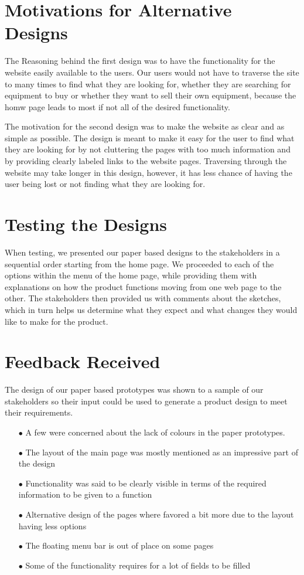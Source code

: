 \documentclass[11pt]{article}
\begin{document}
\newpage

\section{Motivations for Alternative Designs}
	The Reasoning behind the first design was to have the functionality for the website easily available to the users. Our users would not have to traverse the site to many times to find what they are looking for, whether they are searching for equipment to buy or whether they want to sell their own equipment, because the homw page leads to most if not all of the desired functionality.
	
	The motivation for the second design was to make the website as clear and as simple as possible. The design is meant to make it easy for the user to find what they are looking for by not cluttering the pages with too much information and by providing clearly labeled links to the website pages. Traversing through the website may take longer in this design, however, it has less chance of having the user being lost or not finding what they are looking for.

\section{Testing the Designs}
	When testing, we presented our paper based designs to the stakeholders in a sequential order starting from the home page. We proceeded to each of the options within the menu of the home page, while providing them with explanations on how the product functions moving from one web page to the other. The stakeholders then provided us with comments about the sketches, which in turn helps us determine what they expect and what changes they would like to make for the product.

\section{Feedback Received}
	The design of our paper based prototypes was shown to a sample of our stakeholders so their input could be used to generate a product design to meet their requirements.
	\begin{itemize}
		\item[$\bullet$] A few were concerned about the lack of colours in the paper prototypes.
		\item[$\bullet$] The layout of the main page was mostly mentioned as an impressive part of the design
		\item[$\bullet$] Functionality was said to be clearly visible in terms of the required information to be given to a function
		\item[$\bullet$] Alternative design of the pages where favored a bit more due to the layout having less options
		\item[$\bullet$] The floating menu bar is out of place on some pages
		\item[$\bullet$]  Some of the functionality requires for a lot of fields to be filled
	\end{itemize}
\end{document}
